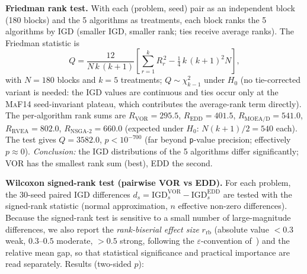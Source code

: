 \documentclass[preprint,12pt]{elsarticle}
\begin{document}
\textbf{Friedman rank test.} With each (problem, seed) pair as an independent
block (180 blocks) and the 5 algorithms as treatments, each block ranks the
5 algorithms by IGD (smaller IGD, smaller rank; ties receive average
ranks). The Friedman statistic is
\begin{equation}
Q = \frac{12}{N\,k\,(k+1)}\left[\sum_{r=1}^{k} R_r^{\,2}
      - \tfrac{1}{4}\,k\,(k+1)^{2}N\right],
\end{equation}
with $N=180$ blocks and $k=5$ treatments; $Q\sim\chi^2_{k-1}$ under $H_0$
(no tie-corrected variant is needed: the IGD values are continuous and
ties occur only at the \textsc{MaF14} seed-invariant plateau, which
contributes the average-rank term directly). The per-algorithm rank sums
are
$R_{\mathrm{VOR}}=295.5$, $R_{\mathrm{EDD}}=401.5$,
$R_{\mathrm{MOEA/D}}=541.0$, $R_{\mathrm{RVEA}}=802.0$,
$R_{\mathrm{NSGA\text{-}2}}=660.0$ (expected under $H_0$:
$N(k+1)/2=540$ each). The test gives $Q=3582.0$,
$p<10^{-700}$ (far beyond \texttt{p}-value precision; effectively
$p\approx 0$).
\emph{Conclusion:} the IGD distributions of the 5 algorithms differ
significantly; \textsc{VOR} has the smallest rank sum (best),
\textsc{EDD} the second.

\textbf{Wilcoxon signed-rank test (pairwise \textsc{VOR} vs \textsc{EDD}).}
For each problem, the 30-seed paired IGD differences
$d_s=\mathrm{IGD}^{\mathrm{VOR}}_s-\mathrm{IGD}^{\mathrm{EDD}}_s$ are
tested with the signed-rank statistic (normal approximation, $n$ effective
non-zero differences). Because the signed-rank test is sensitive to a
small number of large-magnitude differences, we also report the
\emph{rank-biserial effect size} $r_{\mathrm{rb}}$
(absolute value $<0.3$ weak, $0.3$--$0.5$ moderate, $>0.5$ strong,
following the $\varepsilon$-convention of~\cite{rankbiserial2014}) and the
relative mean gap, so that statistical significance and practical
importance are read separately. Results (two-sided $p$):
\end{document}
